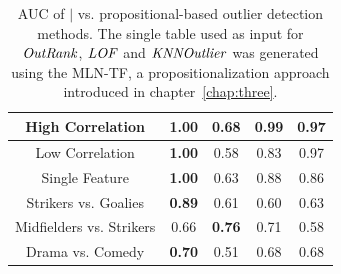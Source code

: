\begin{table}
\begin{subtable}
{\begin{tabular}{|c|c|c|c|c|}
												 		 				High Correlation & \textbf{1.00}&0.68&0.99&0.97 \\ \hline
													 				Low  Correlation & \textbf{1.00}&0.58&0.83&0.97 \\ \hline
						 							 				Single Feature & \textbf{1.00}&0.63&0.88&0.86\\ \hline										 							 				Strikers vs. Goalies & \textbf{0.89} &0.61&0.60&0.63 \\ \hline
												 					Midfielders vs. Strikers  &0.66 &\textbf{0.76} &0.71&0.58 \\ \hline
													 				Drama vs. Comedy & \textbf{0.70} &0.51&0.68&0.68\\ \hline
							 							 			\end{tabular}}
							 							 			\caption{AUC of $\mid$ vs. propositional-based outlier detection methods. The single table used as input for $\it{OutRank}$, $\it{LOF}$ and  $\it{KNNOutlier}$ was generated using the  MLN-TF, a propositionalization approach introduced in chapter~\ref{chap:three}.								 							 			 	%
												 					\label{table:proposMethod Comparison} 
												 							 			}
												 							 		\end{subtable}
												 	\end{table}
%												
%												
